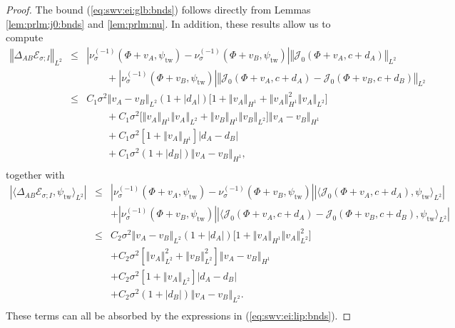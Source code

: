 \documentclass[10pt]{articleHJ}
\newcommand{\abs}[1]{\left\vert#1\right\vert}			%
\newcommand{\norm}[1]{\left\Vert#1\right\Vert}		%
\newcommand{\sref}[1]{(\ref{#1})}                       %
\numberwithin{equation}{section}
\begin{document}
\begin{proof}
The bound \sref{eq:swv:ei:glb:bnds}
follows directly
from Lemmas \ref{lem:prlm:j0:bnds}
and \ref{lem:prlm:nu}.
In addition,
these results allow us
to compute
\begin{equation}
\begin{array}{lcl}
\norm{
 \Delta_{AB} \mathcal{E}_{\sigma;I}
}_{L^2}
& \le &
\abs{\nu^{(-1)}_{\sigma}(\Phi + v_A,\psi_{\mathrm{tw}})
  - \nu^{(-1)}_{\sigma}(\Phi + v_B,\psi_{\mathrm{tw}}) }
 \norm{ \mathcal{J}_0 (\Phi + v_A , c + d_A) }_{L^2}
\\[0.2cm]
& & \qquad
  + \abs{\nu^{(-1)}_{\sigma}(\Phi + v_B, \psi_{\mathrm{tw}}) }
  \norm{ \mathcal{J}_0(\Phi + v_A , c + d_A)
      - \mathcal{J}_0(\Phi + v_B , c + d_B) }_{L^2}
\\[0.2cm]
& \le &
C_1 \sigma^2
 \norm{v_A-v_B}_{L^2}
(1 + \abs{d_A} )
 \big[
   1 + \norm{v_A}_{H^1} + \norm{v_A}_{H^1}^2 \norm{v_A}_{L^2}
 \big]
\\[0.2cm]
& & \qquad
  + C_1 \sigma^2 \big[\norm{v_A}_{H^1} \norm{v_A}_{L^2}
    + \norm{v_B}_{H^1} \norm{v_B}_{L^2} \big] \norm{v_A-v_B}_{H^1}
\\[0.2cm]
& & \qquad  + C_1\sigma^2 [1 + \norm{v_A}_{H^1} ]
    \abs{d_A - d_B }
\\[0.2cm]
& & \qquad
  + C_1 \sigma^2 ( 1 + \abs{d_B} ) \norm{v_A-v_B}_{H^1},
\\[0.2cm]
\end{array}
\end{equation}
together with
\begin{equation}
\begin{array}{lcl}
\abs{ \langle
 \Delta_{AB} \mathcal{E}_{\sigma;I}
, \psi_{\mathrm{tw}} \rangle_{L^2} }
& \le &
\abs{\nu^{(-1)}_{\sigma}(\Phi + v_A, \psi_{\mathrm{tw}})
   - \nu^{(-1)}_{\sigma}(\Phi + v_B, \psi_{\mathrm{tw}}) }
 \abs{ \langle \mathcal{J}_0 (\Phi + v_A , c + d_A) , \psi_{\mathrm{tw}} \rangle_{L^2} }
\\[0.2cm]
& & 
  + \abs{\nu^{(-1)}_{\sigma}(\Phi + v_B, \psi_{\mathrm{tw}}) }
  \abs{ \langle \mathcal{J}_0(\Phi + v_A , c + d_A)
      - \mathcal{J}_0(\Phi + v_B , c + d_B) , \psi_{\mathrm{tw}} \rangle_{L^2} }
\\[0.2cm]
& \le &
C_2 \sigma^2
 \norm{v_A-v_B}_{L^2}
(1 + \abs{d_A} )
 \big[
   1  + \norm{v_A}_{H^1} \norm{v_A}_{L^2}^2
 \big]
\\[0.2cm]
& & 
  + C_2 \sigma^2
    [ \norm{v_A}_{L^2}^2 +  \norm{v_B}_{L^2}^2 ] \norm{v_A-v_B}_{H^1}
\\[0.2cm]
& & 
+ C_2 \sigma^2 [1 + \norm{v_A}_{L^2} ] \abs{d_A - d_B }
\\[0.2cm]
& & 
  + C_2 \sigma^2 ( 1 + \abs{d_B} ) \norm{v_A-v_B}_{L^2} .
\\[0.2cm]
\end{array}
\end{equation}
These terms can all be absorbed
by the expressions in \sref{eq:swv:ei:lip:bnds}.
\end{proof}
\end{document}
